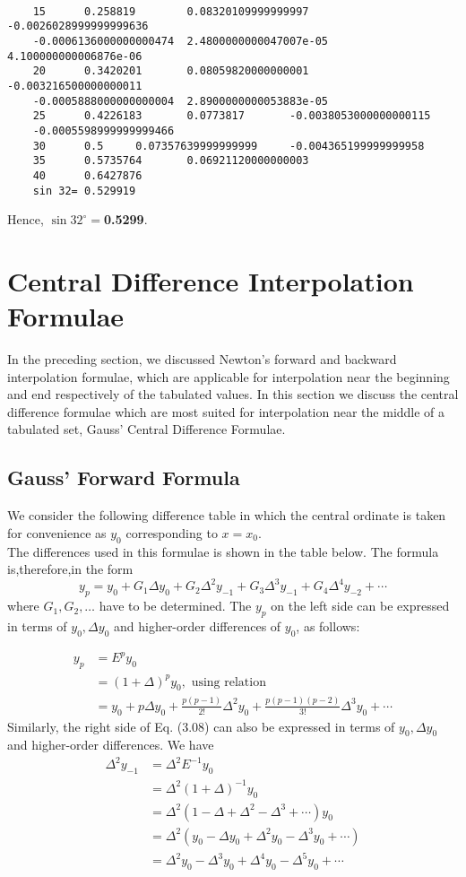 \documentclass[12pt,a4paper,oneside]{book}
\begin{document}
\begin{verbatim}
	
	15      0.258819        0.08320109999999997     -0.0026028999999999636 
	-0.0006136000000000474  2.4800000000047007e-05  4.100000000006876e-06
	20      0.3420201       0.08059820000000001     -0.003216500000000011  
	-0.0005888000000000004  2.8900000000053883e-05
	25      0.4226183       0.0773817       -0.0038053000000000115 
	-0.0005598999999999466
	30      0.5     0.07357639999999999     -0.004365199999999958
	35      0.5735764       0.06921120000000003
	40      0.6427876
	sin 32= 0.529919
\end{verbatim}
Hence, $\sin 32^\circ=$\textbf{0.5299}.

\section{Central Difference Interpolation Formulae }
In the preceding section, we discussed Newton's forward and backward interpolation formulae, which are applicable for interpolation near the beginning and end respectively of the tabulated values. In this section we discuss the central difference formulae which are most suited for interpolation near the middle of a tabulated set,
Gauss' Central Difference Formulae.\\ 
\subsection{Gauss' Forward Formula}
We consider the following difference table in which the central ordinate is taken for convenience as $y_0$ corresponding to $x=x_0$.\\
The differences used in this formulae is shown in the table below. The formula is,therefore,in the form
\begin{equation}\label{3.08}
	y_p=y_0+G_1 \Delta y_0+G_2 \Delta^2 y_{-1}+G_3 \Delta^3 y_{-1}+G_4 \Delta^4 y_{-2}+\cdots
\end{equation}
where $G_1, G_2, \ldots$ have to be determined. The $y_p$ on the left side can be expressed in terms of $y_0, \Delta y_0$ and higher-order differences of $y_0$, as follows:

$$
\begin{aligned}
	y_p & =E^p y_0 \\
	& =(1+\Delta)^p y_0, \text { using relation  } \\
	& =y_0+p \Delta y_0+\frac{p(p-1)}{2 !} \Delta^2 y_0+\frac{p(p-1)(p-2)}{3 !} \Delta^3 y_0+\cdots
\end{aligned}
$$
Similarly, the right side of Eq. (3.08) can also be expressed in terms of $y_0, \Delta y_0$ and higher-order differences. We have
$$
\begin{aligned}
	\Delta^2 y_{-1} & =\Delta^2 E^{-1} y_0 \\
	& =\Delta^2(1+\Delta)^{-1} y_0 \\
	& =\Delta^2\left(1-\Delta+\Delta^2-\Delta^3+\cdots\right) y_0 \\
	& =\Delta^2\left(y_0-\Delta y_0+\Delta^2 y_0-\Delta^3 y_0+\cdots\right) \\
	& =\Delta^2 y_0-\Delta^3 y_0+\Delta^4 y_0-\Delta^5 y_0+\cdots
\end{aligned}
$$
\end{document}
